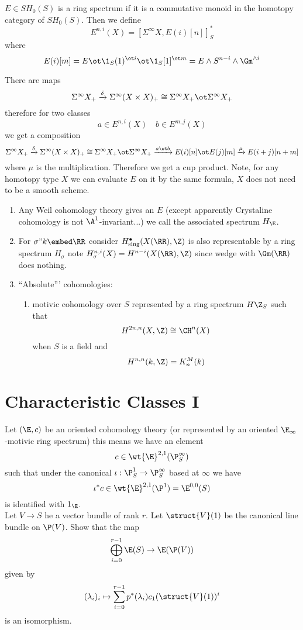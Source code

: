 \documentclass{article}
\begin{document}
\begin{defn}
$E \in SH_0(S)$ is a ring spectrum if it is a commutative monoid in the homotopy category of $SH_0(S)$. Then we define
\[ E^{n,i}(X) = [\Sigma^\infty X, E(i)[n]]^*_S \]
where
\[ E(i)[m] = E \ot \1_S(1)^{\ot i} \ot \1_S[1]^{\ot m} = E \wedge S^{n-i} \wedge \Gm^{\wedge i} \]
\end{defn}

There are maps
\[ \Sigma^\infty X_+ \xrightarrow{\delta} \Sigma^\infty (X \times X)_+ \cong \Sigma^\infty X_+ \ot \Sigma^\infty X_+ \]
therefore for two classes
\[ a \in E^{n,i}(X) \quad b \in E^{m,j}(X) \]
we get a composition
\[  \Sigma^\infty X_+ \xrightarrow{\delta} \Sigma^\infty (X \times X)_+ \cong \Sigma^\infty X_+ \ot \Sigma^\infty X_+ \xrightarrow{a \ot b} E(i)[n] \ot E(j)[m] \xrightarrow{\mu} E(i+j)[n+m]
\]
where $\mu$ is the multiplication. Therefore we get a cup product. Note, for any homotopy type $X$ we can evaluate $E$ on it by the same formula, $X$ does not need to be a smooth scheme.

\begin{example}
\begin{enumerate}
\item Any Weil cohomology theory gives an $E$ (except apparently Crystaline cohomology is not $\A^1$-invariant...) we call the associated spectrum $H_{\E}$. 
\item For $\sigma " k \embed \RR$ consider $H^\bullet_{\text{sing}}(X(\RR), \Z)$ is also representable by a ring spectrum $H_{\sigma}$ note $H_{\sigma}^{n,i}(X) = H^{n-i}(X(\RR), \Z)$ since wedge with $\Gm(\RR)$ does nothing. 
\item ``Absolute''' cohomologies:
\begin{enumerate}
\item motivic cohomology over $S$ represented by a ring spectrum $H \Z_S$ such that
\[ H^{2n, n}(X, \Z) \cong \CH^n(X) \]
when $S$ is a field and 
\[ H^{n,n}(k, \Z) = K^M_n(k) \] 
\end{enumerate}
\end{enumerate}
\end{example}

\section{Characteristic Classes I}

Let $(\E, c)$ be an oriented cohomology theory (or represented by an oriented $\E_\infty$-motivic ring spectrum) this means we have an element
\[ c \in \wt{\E}^{2,1}(\P^\infty_S) \]
such that under the canonical $\iota : \P^1_S \to \P^\infty_S$ based at $\infty$ we have
\[ \iota^* c \in \wt{\E}^{2,1}(\P^1) = \E^{0,0}(S) \]
is identified with $1_{\E}$. 
\bigskip\\
Let $V \to S$ he a vector bundle of rank $r$. Let $\struct{V}(1)$ be the canonical line bundle on $\P(V)$. Show that the map
\[ \bigoplus_{i = 0}^{r - 1} \E(S) \to \E(\P(V)) \]
given by
\[ (\lambda_i)_i \mapsto \sum_{i = 0}^{r-1} p^*(\lambda_i) c_1(\struct{V}(1))^{i} \] 
is an isomorphism. 
\end{document}
